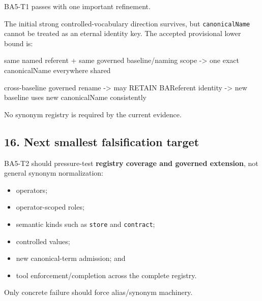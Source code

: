 \documentclass[
  10pt,
  a4paper,
]{article}
\newenvironment{Shaded}{}{}
\newcommand{\NormalTok}[1]{#1}
\providecommand{\tightlist}{%
  \setlength{\itemsep}{0pt}\setlength{\parskip}{0pt}}
\begin{document}
BA5-T1 passes with one important refinement.

The initial strong controlled-vocabulary direction survives, but
\texttt{canonicalName} cannot be treated as an eternal identity key. The
accepted provisional lower bound is:

\begin{Shaded}
\begin{Highlighting}[]
\NormalTok{same named referent}
\NormalTok{+ same governed baseline/naming scope}
\NormalTok{    {-}\textgreater{} one exact canonicalName everywhere shared}

\NormalTok{cross{-}baseline governed rename}
\NormalTok{    {-}\textgreater{} may RETAIN BAReferent identity}
\NormalTok{    {-}\textgreater{} new baseline uses new canonicalName consistently}
\end{Highlighting}
\end{Shaded}

No synonym registry is required by the current evidence.

\subsection{16. Next smallest falsification
target}\label{next-smallest-falsification-target}

BA5-T2 should pressure-test \textbf{registry coverage and governed
extension}, not general synonym normalization:

\begin{itemize}
\tightlist
\item
  operators;
\item
  operator-scoped roles;
\item
  semantic kinds such as \texttt{store} and \texttt{contract};
\item
  controlled values;
\item
  new canonical-term admission; and
\item
  tool enforcement/completion across the complete registry.
\end{itemize}

Only concrete failure should force alias/synonym machinery.
\end{document}
